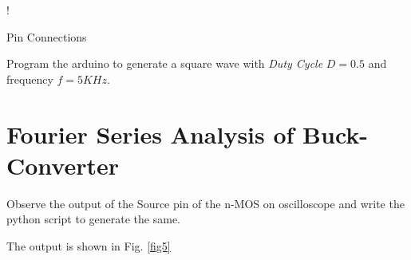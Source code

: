 \documentclass[journal,12pt,twocolumn]{IEEEtran}
\begin{document}
\begin{table}[!h]
\centering
\resizebox {\columnwidth} {!} {

}
\caption{Pin Connections} 
\label{table:connections}
\end{table}    
\begin{problem}
Program the arduino to generate a square wave with {\em Duty Cycle} $D=0.5$ and frequency $f=5KHz$.
\end{problem}
\solution
 
\section{Fourier Series Analysis of Buck-Converter}
\begin{problem}
Observe the output of the Source pin of the n-MOS on oscilloscope and write the python script to generate the same. 
\end{problem}
\solution The output is shown in Fig. \ref{fig5}
 
\end{document}
